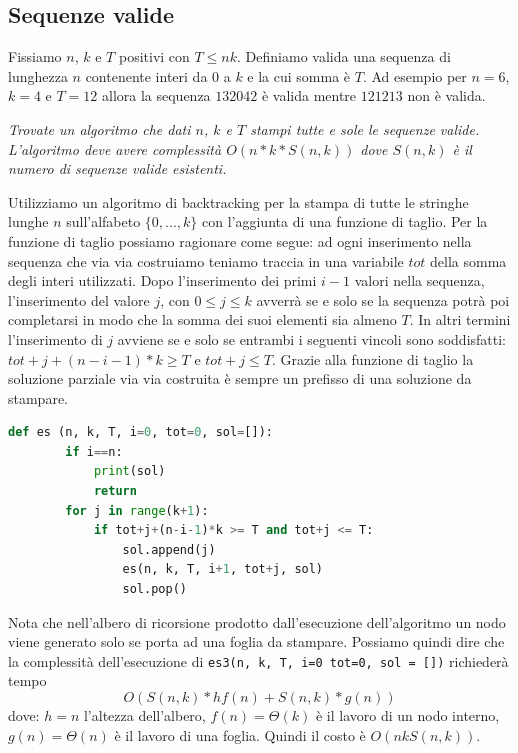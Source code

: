 \subsection{Sequenze valide}
Fissiamo $n$, $k$ e $T$ positivi con $T \leq nk$. Definiamo valida una sequenza di lunghezza $n$ contenente interi da 0 a $k$ e la cui somma è $T$. Ad esempio per $n = 6$, $k =4$ e $T = 12$ allora la sequenza $132042$ è valida mentre $121213$ non è valida. 

\textit{Trovate un algoritmo che dati $n$, $k$ e $T$ stampi tutte e sole le sequenze valide.  L’algoritmo deve avere complessità $O(n* k* S(n, k))$ dove $S(n, k)$ è il numero di sequenze valide esistenti.}

Utilizziamo un algoritmo di backtracking per la stampa di tutte le stringhe lunghe $n$ sull’alfabeto $\{0,...,k\}$ con l’aggiunta di una funzione di taglio. Per la funzione di taglio possiamo ragionare come segue: ad ogni inserimento nella sequenza che via via costruiamo teniamo traccia in una variabile $tot$ della somma degli interi utilizzati. Dopo l’inserimento dei primi $i-1$ valori nella sequenza, l’inserimento del valore $j$, con $0 \leq j \leq k$ avverrà se e solo se la sequenza potrà poi completarsi in modo che la somma dei suoi elementi sia almeno $T$. In altri termini l’inserimento di $j$ avviene se e solo se entrambi i seguenti vincoli sono soddisfatti: $tot + j + (n - i - 1)*k \geq T$ e $tot + j \leq T$. Grazie alla funzione di taglio la soluzione parziale via via costruita è sempre un prefisso di una soluzione da stampare.

\begin{lstlisting}[language=Python]
    def es (n, k, T, i=0, tot=0, sol=[]):
        if i==n:
            print(sol)
            return
        for j in range(k+1):
            if tot+j+(n-i-1)*k >= T and tot+j <= T:
                sol.append(j)
                es(n, k, T, i+1, tot+j, sol)
                sol.pop()
\end{lstlisting}
Nota che nell'albero di ricorsione prodotto dall'esecuzione dell'algoritmo un nodo viene generato solo se porta ad una foglia da stampare. Possiamo quindi dire che la complessità dell'esecuzione di \verb|es3(n, k, T, i=0 tot=0, sol = [])| richiederà tempo 
\begin{equation*}
    O(S(n, k) * hf(n) + S(n, k) * g(n))
\end{equation*}
dove: $h = n$ l'altezza dell'albero, $f(n) = \Theta(k)$ è il lavoro di un nodo interno, $g(n) = \Theta(n)$ è il lavoro di una foglia. Quindi il costo è $O(nkS(n, k))$.

